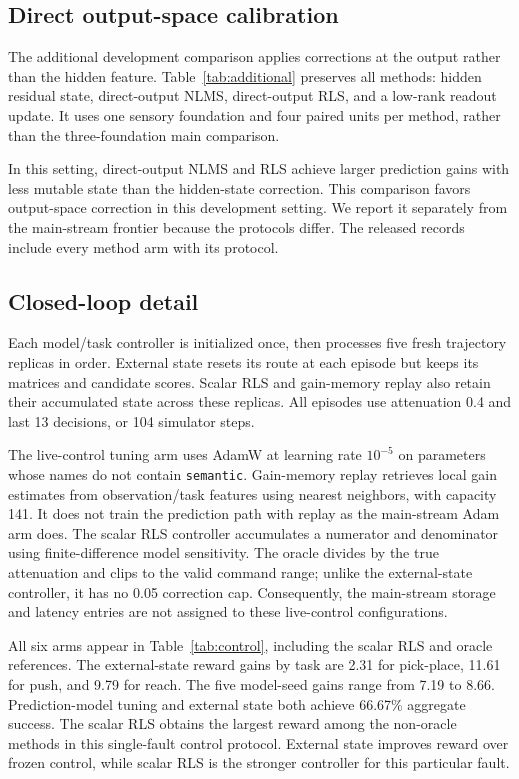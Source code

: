 \subsection{Direct output-space calibration}
\label{app:additional}
The additional development comparison applies corrections at the output
rather than the hidden feature. Table~\ref{tab:additional} preserves all
methods: hidden residual state, direct-output NLMS, direct-output RLS, and a
low-rank readout update. It uses one sensory foundation and four paired units
per method, rather than the three-foundation main comparison.


In this setting, direct-output NLMS and RLS achieve larger prediction gains
with less mutable state than the hidden-state correction. This comparison favors output-space correction in this development setting.
We report it separately from the main-stream frontier because the protocols
differ. The released records include every method arm with its protocol.

\subsection{Closed-loop detail}
\label{app:control}
Each model/task controller is initialized once, then processes five fresh
trajectory replicas in order. External state resets its route at each episode
but keeps its matrices and candidate scores. Scalar RLS and gain-memory replay
also retain their accumulated state across these replicas. All episodes use
attenuation 0.4 and last 13 decisions, or 104 simulator steps.

The live-control tuning arm uses AdamW at learning rate $10^{-5}$ on parameters
whose names do not contain \texttt{semantic}. Gain-memory replay retrieves
local gain estimates from observation/task features using nearest neighbors,
with capacity 141. It does not train the prediction path with replay as the
main-stream Adam arm does. The scalar RLS controller accumulates a numerator
and denominator using finite-difference model sensitivity. The oracle divides
by the true attenuation and clips to the valid command range; unlike the
external-state controller, it has no 0.05 correction cap. Consequently, the
main-stream storage and latency entries are not assigned to these live-control
configurations.

All six arms appear in Table~\ref{tab:control}, including the scalar RLS and
oracle references. The external-state reward gains by task are 2.31 for
pick-place, 11.61 for push, and 9.79 for reach. The five model-seed gains range
from 7.19 to 8.66. Prediction-model tuning and external state both achieve
66.67\% aggregate success. The scalar RLS obtains the largest reward among
the non-oracle methods in this single-fault control protocol. External state improves reward over frozen control, while scalar RLS is the
stronger controller for this particular fault.
